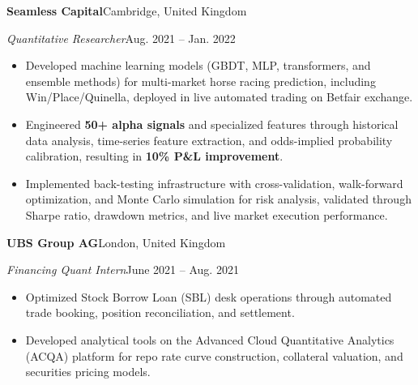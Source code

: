 \documentclass[10pt,a4paper]{article}
\newcommand{\experience}[4]{%
    \textbf{#1}\hfill #2\par\vspace{-0.5\baselineskip}%
    \textit{#3}\hfill #4\par\vspace{-0.5\baselineskip}%
}
\begin{document}
\experience{Seamless Capital}{Cambridge, United Kingdom}
{Quantitative Researcher}{Aug. 2021 -- Jan. 2022}
\begin{itemize}
    \item Developed machine learning models (GBDT, MLP, transformers, and ensemble methods) for multi-market horse racing prediction, including Win/Place/Quinella, deployed in live automated trading on Betfair exchange.
    \item Engineered \textbf{50+ alpha signals} and specialized features through historical data analysis, time-series feature extraction, and odds-implied probability calibration, resulting in \textbf{10\% P\&L improvement}.
    \item Implemented back-testing infrastructure with cross-validation, walk-forward optimization, and Monte Carlo simulation for risk analysis, validated through Sharpe ratio, drawdown metrics, and live market execution performance.
\end{itemize}

\experience{UBS Group AG}{London, United Kingdom}
{Financing Quant Intern}{June 2021 -- Aug. 2021}
\begin{itemize}
    \item Optimized Stock Borrow Loan (SBL) desk operations through automated trade booking, position reconciliation, and settlement.
    \item Developed analytical tools on the Advanced Cloud Quantitative Analytics (ACQA) platform for repo rate curve construction, collateral valuation, and securities pricing models.
\end{itemize}

\end{document}
